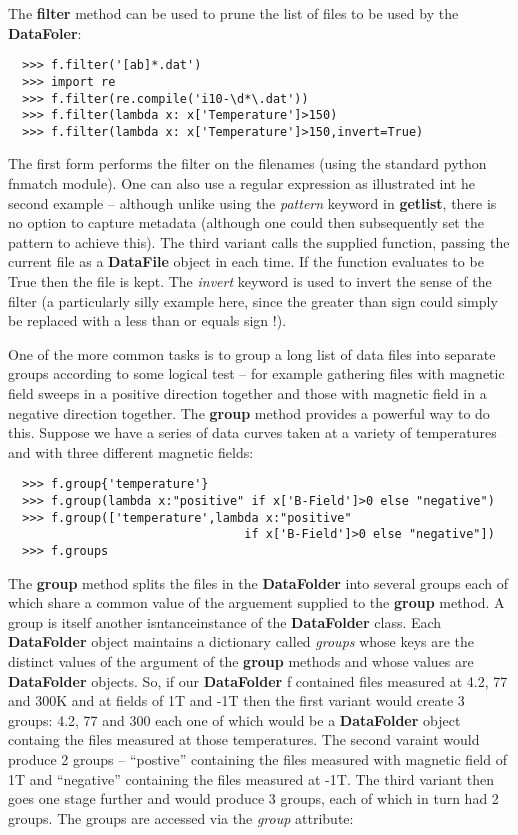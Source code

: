 \documentclass[a4paper,11pt]{scrartcl}
\begin{document}
The \textbf{filter} method can be used to prune the list of files to be used by the \textbf{DataFoler}:

\begin{verbatim}
  >>> f.filter('[ab]*.dat')
  >>> import re
  >>> f.filter(re.compile('i10-\d*\.dat'))
  >>> f.filter(lambda x: x['Temperature']>150)
  >>> f.filter(lambda x: x['Temperature']>150,invert=True)
\end{verbatim}

The first form performs the filter on the filenames (using the standard python fnmatch module). One can also use a regular expression as illustrated int he second example -- although unlike using the \textit{pattern} keyword in \textbf{getlist}, there is no option to capture metadata (although one could then subsequently set the pattern to achieve this). The third variant calls the supplied function, passing the current file as a \textbf{DataFile} object in each time. If the function evaluates to be True then the file is kept. The \textit{invert} keyword is used to invert the sense of the filter (a particularly silly example here, since the greater than sign could simply be replaced with a less than or equals sign !).

One of the more common tasks is to group a long list of data files into separate groups according to some logical test --  for example gathering files with magnetic field sweeps in a positive direction together and those with magnetic field in a negative direction together. The \textbf{group} method provides a powerful way to do this. Suppose we have a series of data curves taken at a variety of temperatures and with three different magnetic fields:

\begin{verbatim}
  >>> f.group{'temperature'}
  >>> f.group(lambda x:"positive" if x['B-Field']>0 else "negative")
  >>> f.group(['temperature',lambda x:"positive"
                                 if x['B-Field']>0 else "negative"])
  >>> f.groups
\end{verbatim}

The \textbf{group} method splits the files in the \textbf{DataFolder} into several groups each of which share a common value of the arguement supplied to the \textbf{group} method. A group is itself another isntanceinstance of the \textbf{DataFolder} class. Each \textbf{DataFolder} object maintains a dictionary called \textit{groups} whose keys are the distinct values of the argument of the \textbf{group} methods and whose values are \textbf{DataFolder} objects. So, if our \textbf{DataFolder} f contained files measured at 4.2, 77 and 300K and at fields of 1T and -1T then the first variant would create 3 groups: 4.2, 77 and 300 each one of which would be a \textbf{DataFolder} object containg the files measured at those temperatures. The second varaint would produce 2 groups -- ``postive'' containing the files measured with magnetic field of 1T and ``negative'' containing the files measured at -1T. The third variant then goes one stage further and would produce 3 groups, each of which in turn had 2 groups. The groups are accessed via the \textit{group} attribute:
\end{document}
